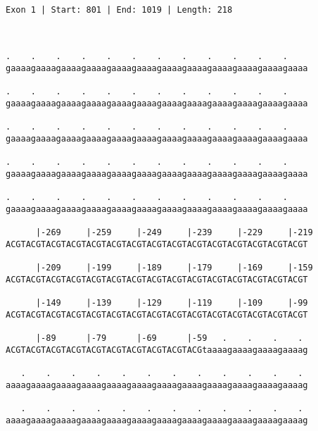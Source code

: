 \documentclass{article}
\begin{document}
 \begin{Verbatim}
 
Exon 1 | Start: 801 | End: 1019 | Length: 218



.    .    .    .    .    .    .    .    .    .    .    .    
gaaaagaaaagaaaagaaaagaaaagaaaagaaaagaaaagaaaagaaaagaaaagaaaa
                                                            
.    .    .    .    .    .    .    .    .    .    .    .    
gaaaagaaaagaaaagaaaagaaaagaaaagaaaagaaaagaaaagaaaagaaaagaaaa
                                                            
.    .    .    .    .    .    .    .    .    .    .    .    
gaaaagaaaagaaaagaaaagaaaagaaaagaaaagaaaagaaaagaaaagaaaagaaaa
                                                            
.    .    .    .    .    .    .    .    .    .    .    .    
gaaaagaaaagaaaagaaaagaaaagaaaagaaaagaaaagaaaagaaaagaaaagaaaa
                                                            
.    .    .    .    .    .    .    .    .    .    .    .    
gaaaagaaaagaaaagaaaagaaaagaaaagaaaagaaaagaaaagaaaagaaaagaaaa
                                                            
      |-269     |-259     |-249     |-239     |-229     |-219
ACGTACGTACGTACGTACGTACGTACGTACGTACGTACGTACGTACGTACGTACGTACGT
                                                            
      |-209     |-199     |-189     |-179     |-169     |-159
ACGTACGTACGTACGTACGTACGTACGTACGTACGTACGTACGTACGTACGTACGTACGT
                                                            
      |-149     |-139     |-129     |-119     |-109     |-99
ACGTACGTACGTACGTACGTACGTACGTACGTACGTACGTACGTACGTACGTACGTACGT
                                                            
      |-89      |-79      |-69      |-59   .    .    .    . 
ACGTACGTACGTACGTACGTACGTACGTACGTACGTACGtaaaagaaaagaaaagaaaag
                                                            
   .    .    .    .    .    .    .    .    .    .    .    . 
aaaagaaaagaaaagaaaagaaaagaaaagaaaagaaaagaaaagaaaagaaaagaaaag
                                                            
   .    .    .    .    .    .    .    .    .    .    .    . 
aaaagaaaagaaaagaaaagaaaagaaaagaaaagaaaagaaaagaaaagaaaagaaaag
                                                            

\end{Verbatim}
\end{document}
